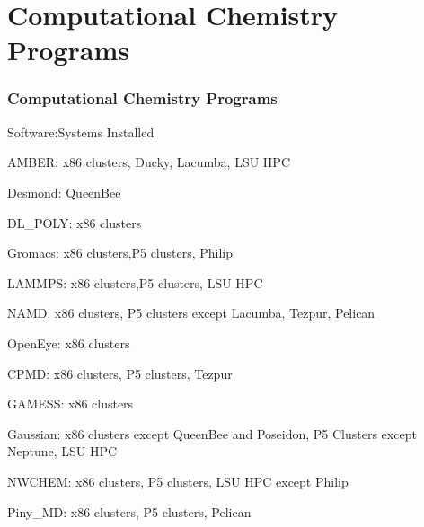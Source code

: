 \documentclass[slidestop,mathserif,compress,xcolor=svgnames]{beamer}
\begin{document}
\section{Computational Chemistry Programs}
\begin{frame}
\frametitle{\small Computational Chemistry Programs}
\begin{block}{Software:Systems Installed}
\begin{itemize}
{\footnotesize
\item {\color{Blue}AMBER}: x86 clusters, Ducky, Lacumba, LSU HPC 
\item{\color{Blue}Desmond}: QueenBee
\item {\color{Blue}DL\_POLY}: x86 clusters
\item {\color{Blue}Gromacs}: x86 clusters,P5 clusters, Philip
\item {\color{Blue}LAMMPS}: x86 clusters,P5 clusters, LSU HPC 
\item {\color{Blue}NAMD}: x86 clusters, P5 clusters except Lacumba, Tezpur, Pelican
\item{\color{Blue}OpenEye}: x86 clusters
\item {\color{Blue}CPMD}: x86 clusters, P5 clusters, Tezpur
\item {\color{Blue}GAMESS}: x86 clusters
\item {\color{Blue}Gaussian}: x86 clusters except QueenBee and Poseidon, P5 Clusters except Neptune, LSU HPC 
\item {\color{Blue}NWCHEM}: x86 clusters, P5 clusters, LSU HPC except Philip
\item{\color{Blue}Piny\_MD}: x86 clusters, P5 clusters, Pelican
}
\end{itemize}
\end{block}
\end{frame}
\end{document}
